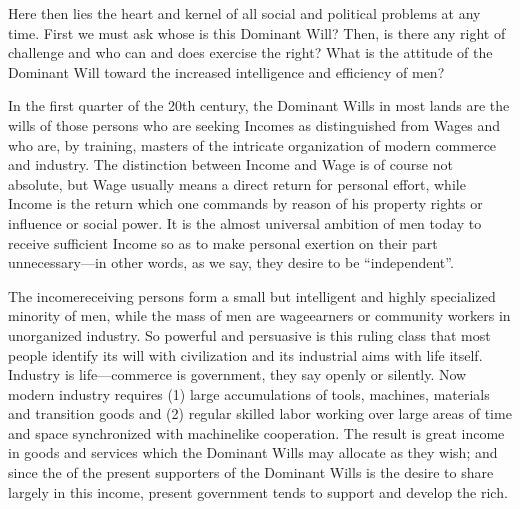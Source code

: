 \documentclass[letterpaper,10pt,english]{jupyterBook}
\begin{document}
\sphinxAtStartPar
Here then lies the heart and kernel of all social and political problems at any time. First we must ask whose is this Dominant Will? Then, is there any right of challenge and who can and does exercise the right? What is the attitude of the Dominant Will toward the increased intelligence and efficiency of men?

\sphinxAtStartPar
In the first quarter of the 20th century, the Dominant Wills in most lands are the wills of those persons who are seeking Incomes as distinguished from Wages and who are, by training, masters of the intricate organization of modern commerce and industry. The distinction between Income and Wage is of course not absolute, but Wage usually means a direct return for personal effort, while Income is the return which one commands by reason of his property rights or influence or social power. It is the almost universal ambition of men today to receive sufficient Income so as to make personal exertion on their part unnecessary—in other words, as we say, they desire to be “independent”.

\sphinxAtStartPar
The income\sphinxhyphen{}receiving persons form a small but intelligent and highly specialized minority of men, while the mass of men are wage\sphinxhyphen{}earners or community workers in unorganized industry. So powerful and persuasive is this ruling class that most people identify its will with civilization and its industrial aims with life itself. Industry is life—commerce is government, they say openly or silently. Now modern industry  requires (1) large accumulations of tools, machines, materials and transition goods and (2) regular skilled labor working over large areas of time and space synchronized with machine\sphinxhyphen{}like co\sphinxhyphen{}operation. The result is great income in goods and services which the Dominant Wills may allocate as they wish; and since the  of the present supporters of the Dominant Wills is the desire to share largely in this income, present government tends to support and develop the rich.
\end{document}
